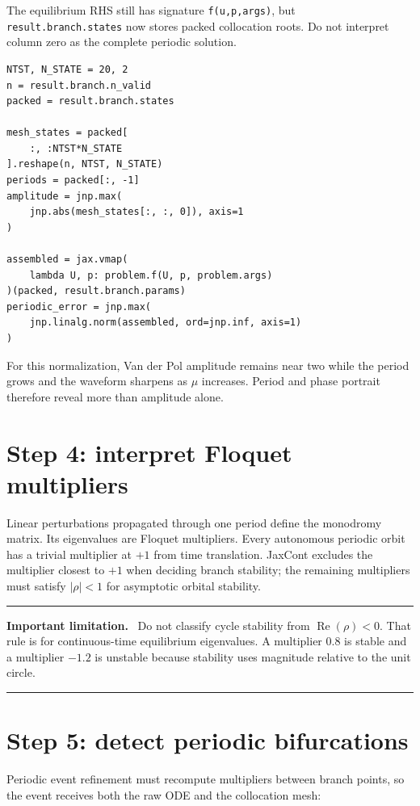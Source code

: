 \documentclass[11pt,oneside]{book}
\newenvironment{warningbox}
  {\par\medskip\noindent\begin{minipage}{\textwidth}
   \color{JaxRed}\rule{\textwidth}{0.8pt}\par
   \textbf{Important limitation.}\ \color{black}}
  {\par\color{JaxRed}\rule{\textwidth}{0.8pt}
   \end{minipage}\par\medskip}
\begin{document}
The equilibrium RHS still has signature \texttt{f(u,p,args)}, but
\texttt{result.branch.states} now stores packed collocation roots. Do not
interpret column zero as the complete periodic solution.

\begin{lstlisting}
NTST, N_STATE = 20, 2
n = result.branch.n_valid
packed = result.branch.states

mesh_states = packed[
    :, :NTST*N_STATE
].reshape(n, NTST, N_STATE)
periods = packed[:, -1]
amplitude = jnp.max(
    jnp.abs(mesh_states[:, :, 0]), axis=1
)

assembled = jax.vmap(
    lambda U, p: problem.f(U, p, problem.args)
)(packed, result.branch.params)
periodic_error = jnp.max(
    jnp.linalg.norm(assembled, ord=jnp.inf, axis=1)
)
\end{lstlisting}

For this normalization, Van der Pol amplitude remains near two while the period
grows and the waveform sharpens as $\mu$ increases. Period and phase portrait
therefore reveal more than amplitude alone.

\section{Step 4: interpret Floquet multipliers}

Linear perturbations propagated through one period define the monodromy
matrix. Its eigenvalues are Floquet multipliers. Every autonomous periodic
orbit has a trivial multiplier at $+1$ from time translation. JaxCont excludes
the multiplier closest to $+1$ when deciding branch stability; the remaining
multipliers must satisfy $|\rho|<1$ for asymptotic orbital stability.

\begin{warningbox}
Do not classify cycle stability from $\operatorname{Re}(\rho)<0$. That rule is
for continuous-time equilibrium eigenvalues. A multiplier $0.8$ is stable and
a multiplier $-1.2$ is unstable because stability uses magnitude relative to
the unit circle.
\end{warningbox}

\section{Step 5: detect periodic bifurcations}

Periodic event refinement must recompute multipliers between branch points, so
the event receives both the raw ODE and the collocation mesh:
\end{document}
